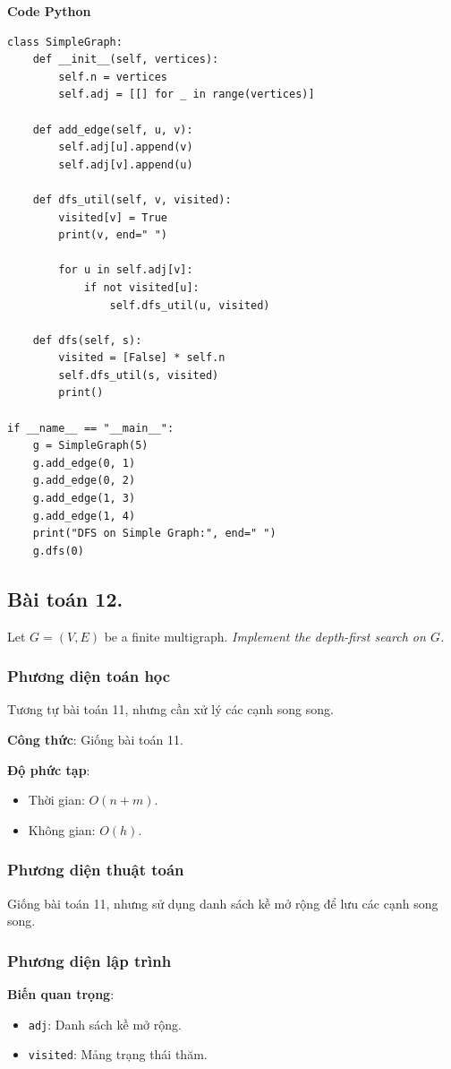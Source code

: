 \documentclass[a4paper,12pt]{article}
\begin{document}
\textbf{Code Python}
\lstset{language=Python}
\begin{lstlisting}
class SimpleGraph:
    def __init__(self, vertices):
        self.n = vertices
        self.adj = [[] for _ in range(vertices)]

    def add_edge(self, u, v):
        self.adj[u].append(v)
        self.adj[v].append(u)

    def dfs_util(self, v, visited):
        visited[v] = True
        print(v, end=" ")

        for u in self.adj[v]:
            if not visited[u]:
                self.dfs_util(u, visited)

    def dfs(self, s):
        visited = [False] * self.n
        self.dfs_util(s, visited)
        print()

if __name__ == "__main__":
    g = SimpleGraph(5)
    g.add_edge(0, 1)
    g.add_edge(0, 2)
    g.add_edge(1, 3)
    g.add_edge(1, 4)
    print("DFS on Simple Graph:", end=" ")
    g.dfs(0)
\end{lstlisting}

\subsection{Bài toán 12.} Let $G = (V, E)$ be a finite multigraph. \textit{Implement the depth-first search on $G$.}

\subsubsection{Phương diện toán học}
Tương tự bài toán 11, nhưng cần xử lý các cạnh song song.

\textbf{Công thức}: Giống bài toán 11.

\textbf{Độ phức tạp}: 
\begin{itemize}
    \item Thời gian: \( O(n + m) \).
    \item Không gian: \( O(h) \).
\end{itemize}

\subsubsection{Phương diện thuật toán}
Giống bài toán 11, nhưng sử dụng danh sách kề mở rộng để lưu các cạnh song song.

\subsubsection{Phương diện lập trình}
\textbf{Biến quan trọng}:
\begin{itemize}
    \item \texttt{adj}: Danh sách kề mở rộng.
    \item \texttt{visited}: Mảng trạng thái thăm.
\end{itemize}
\end{document}
